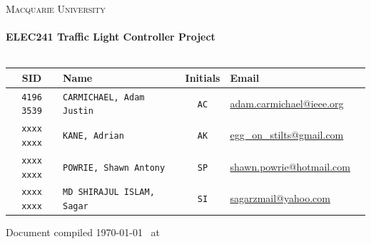 \begin{titlepage}
\begin{center}

\textsc{\LARGE Macquarie University}\\[1.5cm]
\HRule \\[0.9cm]

{ \huge \bfseries ELEC241 Traffic Light Controller Project}\\[0.4cm]
\HRule \\[1.5cm]

\vfill

\begin{tabularx}{\linewidth}{ c X c X X }
\hline
  SID & Name & Initials & Email \\
  \hline
  \texttt{4196 3539} & \texttt{CARMICHAEL, Adam Justin}  & \texttt{AC} & \url{adam.carmichael@ieee.org} \\
  \texttt{xxxx xxxx} & \texttt{KANE, Adrian}             & \texttt{AK} & \url{egg_on_stilts@gmail.com} \\
  \texttt{xxxx xxxx} & \texttt{POWRIE, Shawn Antony}     & \texttt{SP} & \url{shawn.powrie@hotmail.com} \\
  \texttt{xxxx xxxx} & \texttt{MD SHIRAJUL ISLAM, Sagar} & \texttt{SI} & \url{sagarzmail@yahoo.com} \\
\end{tabularx}

\vspace{1cm}
\small{Document compiled \today ~ at \currenttime}
\end{center}

\thiswatermark{
 
}
\end{titlepage}
